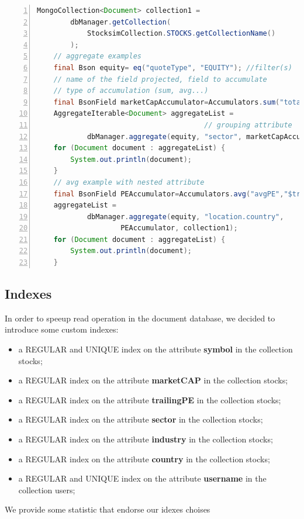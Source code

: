 \begin{lstlisting}[basicstyle=\footnotesize,language=Java,numbers=left,
    numberstyle=\footnotesize,numbersep=4pt,frame=single]
    MongoCollection<Document> collection1 = 
        dbManager.getCollection(
            StocksimCollection.STOCKS.getCollectionName()
        );
    // aggregate examples
    final Bson equity= eq("quoteType", "EQUITY"); //filter(s)
    // name of the field projected, field to accumulate
    // type of accumulation (sum, avg...)
    final BsonField marketCapAccumulator=Accumulators.sum("totalCap","$marketCap");
    AggregateIterable<Document> aggregateList =
                                        // grouping attribute
            dbManager.aggregate(equity, "sector", marketCapAccumulator, collection1);
    for (Document document : aggregateList) {
        System.out.println(document);
    }
    // avg example with nested attribute
    final BsonField PEAccumulator=Accumulators.avg("avgPE","$trailingPE");
    aggregateList =
            dbManager.aggregate(equity, "location.country",
                    PEAccumulator, collection1);
    for (Document document : aggregateList) {
        System.out.println(document);
    }
\end{lstlisting}
\subsection{Indexes}
In order to speeup read operation in the document database, 
we decided to introduce some custom indexes:
\begin{itemize}
    \item a REGULAR and UNIQUE index on the attribute \textbf{symbol} in the collection stocks;
    \item a REGULAR index on the attribute \textbf{marketCAP} in the collection stocks;
    \item a REGULAR index on the attribute \textbf{trailingPE} in the collection stocks;
    \item a REGULAR index on the attribute \textbf{sector} in the collection stocks;
    \item a REGULAR index on the attribute \textbf{industry} in the collection stocks;
    \item a REGULAR index on the attribute \textbf{country} in the collection stocks;
    \item a REGULAR and UNIQUE index on the attribute \textbf{username} in the collection users;
\end{itemize}
We provide some statistic that endorse our idexes choises\\

